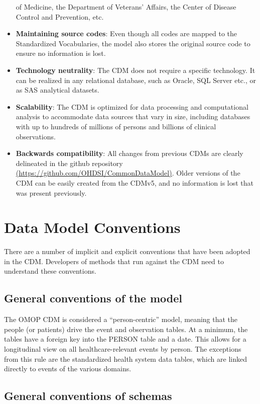 \documentclass[11pt]{book}
\begin{document}
\begin{itemize}
  of Medicine, the Department of Veterans' Affairs, the Center of
  Disease Control and Prevention, etc.
\item
  \textbf{Maintaining source codes}: Even though all codes are mapped to
  the Standardized Vocabularies, the model also stores the original
  source code to ensure no information is lost.
\item
  \textbf{Technology neutrality}: The CDM does not require a specific
  technology. It can be realized in any relational database, such as
  Oracle, SQL Server etc., or as SAS analytical datasets.
\item
  \textbf{Scalability}: The CDM is optimized for data processing and
  computational analysis to accommodate data sources that vary in size,
  including databases with up to hundreds of millions of persons and
  billions of clinical observations.
\item
  \textbf{Backwards compatibility}: All changes from previous CDMs are
  clearly delineated in the github repository
  \href{https://github.com/OHDSI/CommonDataModel}{(https://github.com/OHDSI/CommonDataModel)}.
  Older versions of the CDM can be easily created from the CDMv5, and no
  information is lost that was present previously.
\end{itemize}

\section{Data Model Conventions}\label{data-model-conventions}

There are a number of implicit and explicit conventions that have been
adopted in the CDM. Developers of methods that run against the CDM need
to understand these conventions.

\subsection{General conventions of the model}\label{model-conv}

The OMOP CDM is considered a ``person-centric'' model, meaning that the
people (or patients) drive the event and observation tables. At a
minimum, the tables have a foreign key into the PERSON table and a date.
This allows for a longitudinal view on all healthcare-relevant events by
person. The exceptions from this rule are the standardized health system
data tables, which are linked directly to events of the various domains.

\subsection{General conventions of
schemas}\label{general-conventions-of-schemas}
\end{document}
